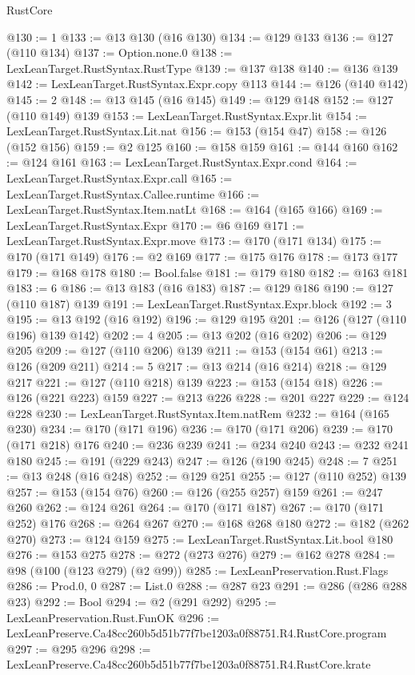 \begin{lexlean}{RustCore}
\begin{coremodule}
@130 := 1
@133 := @13 @130 (@16 @130)
@134 := @129 @133
@136 := @127 (@110 @134)
@137 := Option.none.{0}
@138 := LexLeanTarget.RustSyntax.RustType
@139 := @137 @138
@140 := @136 @139
@142 := LexLeanTarget.RustSyntax.Expr.copy @113
@144 := @126 (@140 @142)
@145 := 2
@148 := @13 @145 (@16 @145)
@149 := @129 @148
@152 := @127 (@110 @149) @139
@153 := LexLeanTarget.RustSyntax.Expr.lit
@154 := LexLeanTarget.RustSyntax.Lit.nat
@156 := @153 (@154 @47)
@158 := @126 (@152 @156)
@159 := @2 @125
@160 := @158 @159
@161 := @144 @160
@162 := @124 @161
@163 := LexLeanTarget.RustSyntax.Expr.cond
@164 := LexLeanTarget.RustSyntax.Expr.call
@165 := LexLeanTarget.RustSyntax.Callee.runtime
@166 := LexLeanTarget.RustSyntax.Item.natLt
@168 := @164 (@165 @166)
@169 := LexLeanTarget.RustSyntax.Expr
@170 := @6 @169
@171 := LexLeanTarget.RustSyntax.Expr.move
@173 := @170 (@171 @134)
@175 := @170 (@171 @149)
@176 := @2 @169
@177 := @175 @176
@178 := @173 @177
@179 := @168 @178
@180 := Bool.false
@181 := @179 @180
@182 := @163 @181
@183 := 6
@186 := @13 @183 (@16 @183)
@187 := @129 @186
@190 := @127 (@110 @187) @139
@191 := LexLeanTarget.RustSyntax.Expr.block
@192 := 3
@195 := @13 @192 (@16 @192)
@196 := @129 @195
@201 := @126 (@127 (@110 @196) @139 @142)
@202 := 4
@205 := @13 @202 (@16 @202)
@206 := @129 @205
@209 := @127 (@110 @206) @139
@211 := @153 (@154 @61)
@213 := @126 (@209 @211)
@214 := 5
@217 := @13 @214 (@16 @214)
@218 := @129 @217
@221 := @127 (@110 @218) @139
@223 := @153 (@154 @18)
@226 := @126 (@221 @223) @159
@227 := @213 @226
@228 := @201 @227
@229 := @124 @228
@230 := LexLeanTarget.RustSyntax.Item.natRem
@232 := @164 (@165 @230)
@234 := @170 (@171 @196)
@236 := @170 (@171 @206)
@239 := @170 (@171 @218) @176
@240 := @236 @239
@241 := @234 @240
@243 := @232 @241 @180
@245 := @191 (@229 @243)
@247 := @126 (@190 @245)
@248 := 7
@251 := @13 @248 (@16 @248)
@252 := @129 @251
@255 := @127 (@110 @252) @139
@257 := @153 (@154 @76)
@260 := @126 (@255 @257) @159
@261 := @247 @260
@262 := @124 @261
@264 := @170 (@171 @187)
@267 := @170 (@171 @252) @176
@268 := @264 @267
@270 := @168 @268 @180
@272 := @182 (@262 @270)
@273 := @124 @159
@275 := LexLeanTarget.RustSyntax.Lit.bool @180
@276 := @153 @275
@278 := @272 (@273 @276)
@279 := @162 @278
@284 := @98 (@100 (@123 @279) (@2 @99))
@285 := LexLeanPreservation.Rust.Flags
@286 := Prod.{0, 0}
@287 := List.{0}
@288 := @287 @23
@291 := @286 (@286 @288 @23)
@292 := Bool
@294 := @2 (@291 @292)
@295 := LexLeanPreservation.Rust.FunOK
@296 := LexLeanPreserve.Ca48cc260b5d51b77f7be1203a0f88751.R4.RustCore.program
@297 := @295 @296
@298 := LexLeanPreserve.Ca48cc260b5d51b77f7be1203a0f88751.R4.RustCore.krate

\end{coremodule}
\end{lexlean}

